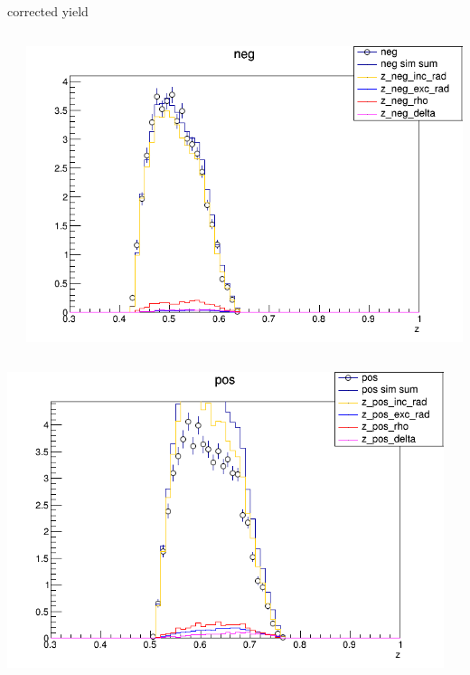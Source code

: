 \begin{frame}{corrected yield}
\begin{columns}
\begin{column}[T]{0.25\textwidth}
\end{column}
\begin{column}[T]{0.25\textwidth}
\includegraphics[width = \textwidth]{results/yield/statistics_corr/yield_x_Q2_z_0.50_5.500_0.50_neg.png}
\end{column}
\end{columns}
\begin{columns}
\begin{column}[T]{0.25\textwidth}
\includegraphics[width = \textwidth]{results/yield/statistics_corr/yield_x_Q2_z_0.50_5.500_0.60_pos.png}
\end{column}
\begin{column}[T]{0.25\textwidth}

\end{column}
\end{columns}
\end{frame}
